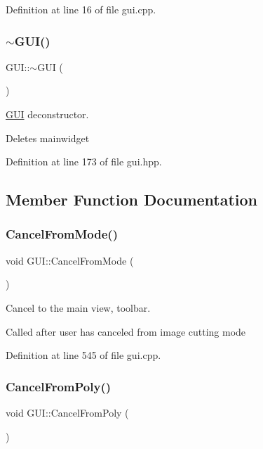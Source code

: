 Definition at line 16 of file gui.\+cpp.

\mbox{\label{classGUI_ac9cae2328dcb5d83bdfaeca49a2eb695}} 
\subsubsection{\texorpdfstring{$\sim$\+G\+U\+I()}{~GUI()}}
{\footnotesize\ttfamily G\+U\+I\+::$\sim$\+G\+UI (\begin{DoxyParamCaption}{ }\end{DoxyParamCaption})\hspace{0.3cm}{\ttfamily [inline]}}



\mbox{\hyperlink{classGUI}{G\+UI}} deconstructor. 

Deletes mainwidget 

Definition at line 173 of file gui.\+hpp.



\subsection{Member Function Documentation}
\mbox{\label{classGUI_a8188dd01b2dc9354afbbf2f4b18fd19a}} 
\subsubsection{\texorpdfstring{Cancel\+From\+Mode()}{CancelFromMode()}}
{\footnotesize\ttfamily void G\+U\+I\+::\+Cancel\+From\+Mode (\begin{DoxyParamCaption}{ }\end{DoxyParamCaption})}



Cancel to the main view, toolbar. 

Called after user has canceled from image cutting mode 

Definition at line 545 of file gui.\+cpp.

\mbox{\label{classGUI_a9f2b3abf533a7c720b817caed653da2e}} 
\subsubsection{\texorpdfstring{Cancel\+From\+Poly()}{CancelFromPoly()}}
{\footnotesize\ttfamily void G\+U\+I\+::\+Cancel\+From\+Poly (\begin{DoxyParamCaption}{ }\end{DoxyParamCaption})}



